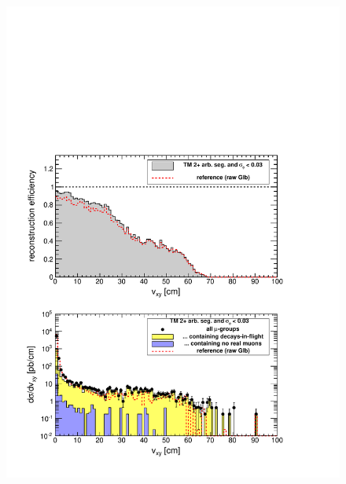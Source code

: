 \documentclass[12pt]{article}
\begin{document}
\begin{figure}
\begin{center}
\begin{multicols}{2}
\includegraphics[width=\linewidth]{fig/backgrounds3_plot/dispvert_TrackerSegMatch2PhiErr.pdf}


\end{multicols}
\end{center}
\end{figure}
\end{document}
